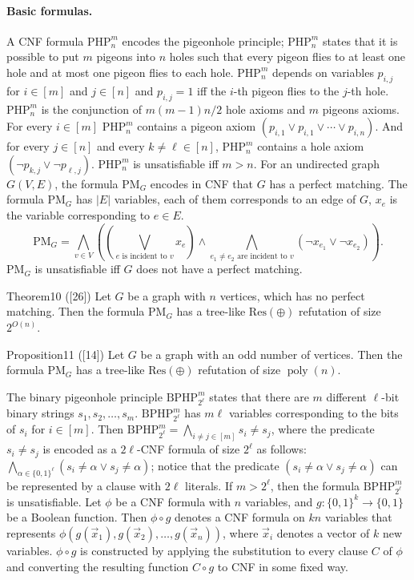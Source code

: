 \paragraph{Basic formulas.} A CNF formula $\mathrm{PHP}_n^m$ encodes the pigeonhole principle; $\mathrm{PHP}_n^m$ states that it is possible to put $m$ pigeons into $n$ holes such that every pigeon flies to at least one hole and at most one pigeon flies to each hole. $\mathrm{PHP}_n^m$ depends on variables $p_{i,j}$ for $i\in[m]$ and $j\in[n]$ and $p_{i,j}=1$ iff the $i$-th pigeon flies to the $j$-th hole. $\mathrm{PHP}_n^m$ is the conjunction of $m(m-1)n/2$ hole axioms and $m$ pigeons axioms. For every $i\in[m]$ $\mathrm{PHP}_n^m$ contains a pigeon axiom $(p_{i,1}\vee p_{i,1}\vee\cdots\vee p_{i,n})$. And for every $j\in[n]$ and every $k\ne\ell\in[n]$, $\mathrm{PHP}_n^m$ contains a hole axiom $(\neg p_{k,j}\vee\neg p_{\ell,j})$. $\mathrm{PHP}_n^m$ is unsatisfiable iff $m>n$.
For an undirected graph $G(V,E)$, the formula $\mathrm{PM}_G$ encodes in CNF that $G$ has a perfect matching. The formula $\mathrm{PM}_G$ has $|E|$ variables, each of them corresponds to an edge of $G$, $x_e$ is the variable corresponding to $e\in E$.
\[\mathrm{PM}_G=\bigwedge_{v\in V}\left(\left(\bigvee_{e\text{ is incident to }v}x_e\right)\wedge\bigwedge_{e_1\ne e_2\text{ are incident to }v}(\neg x_{e_1}\vee\neg x_{e_2})\right).\]
$\mathrm{PM}_G$ is unsatisfiable iff $G$ does not have a perfect matching.
\begin{authorclaim}{Theorem10 ([26])}
Let $G$ be a graph with $n$ vertices, which has no perfect matching. Then the formula $\mathrm{PM}_G$ has a tree-like $\mathrm{Res}(\oplus)$ refutation of size $2^{O(n)}$.
\end{authorclaim}
\begin{authorclaim}{Proposition11 ([14])}
Let $G$ be a graph with an odd number of vertices. Then the formula $\mathrm{PM}_G$ has a tree-like $\mathrm{Res}(\oplus)$ refutation of size $\operatorname{poly}(n)$.
\end{authorclaim}
The binary pigeonhole principle $\mathrm{BPHP}_{2^\ell}^m$ states that there are $m$ different $\ell$-bit binary strings $s_1,s_2,\ldots,s_m$. $\mathrm{BPHP}_{2^\ell}^m$ has $m\ell$ variables corresponding to the bits of $s_i$ for $i\in[m]$. Then $\mathrm{BPHP}_{2^\ell}^m=\bigwedge_{i\ne j\in[m]}s_i\ne s_j$, where the predicate $s_i\ne s_j$ is encoded as a $2\ell$-CNF formula of size $2^\ell$ as follows: $\bigwedge_{\alpha\in\{0,1\}^\ell}(s_i\ne\alpha\vee s_j\ne\alpha)$; notice that the predicate $(s_i\ne\alpha\vee s_j\ne\alpha)$ can be represented by a clause with $2\ell$ literals. If $m>2^\ell$, then the formula $\mathrm{BPHP}_{2^\ell}^m$ is unsatisfiable.
Let $\phi$ be a CNF formula with $n$ variables, and $g:\{0,1\}^k\to\{0,1\}$ be a Boolean function. Then $\phi\circ g$ denotes a CNF formula on $kn$ variables that represents $\phi(g(\vec x_1),g(\vec x_2),\ldots,g(\vec x_n))$, where $\vec x_i$ denotes a vector of $k$ new variables. $\phi\circ g$ is constructed by applying the substitution to every clause $C$ of $\phi$ and converting the resulting function $C\circ g$ to CNF in some fixed way.
